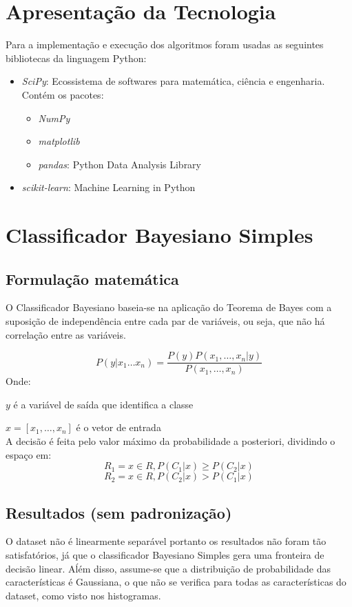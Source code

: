\documentclass[11pt,a4paper]{article}
\numberwithin{equation}{section}
\begin{document}
\section{Apresentação da Tecnologia}
Para a implementação e execução dos algoritmos foram usadas as seguintes  bibliotecas da linguagem Python:

\begin{itemize}
\item \textit{SciPy}: Ecossistema de softwares para matemática, ciência e engenharia. Contém os pacotes:
\begin{itemize}
\item \textit{NumPy}
\item \textit{matplotlib}
\item \textit{pandas}: Python Data Analysis Library
\end{itemize}
\item \textit{scikit-learn}: Machine Learning in Python
\end{itemize}


\section{Classificador Bayesiano Simples}

\subsection{Formulação matemática}
O Classificador Bayesiano baseia-se na aplicação do Teorema de Bayes com a suposição de independência entre cada par de variáveis, ou seja, que não há correlação entre as variáveis.

\[P(y|x_1 \dots x_n)  = \frac{P(y)P(x_1, \dots, x_n|y)}{P(x_1,\dots, x_n)}\]
Onde:

$y$ é a variável de saída que identifica a classe

$x = [x_1, \dots, x_n] $ é o vetor de entrada 
\\
A decisão é feita pelo valor máximo da probabilidade a posteriori, dividindo o espaço em:
\[ R_1 = {x \in R, P(C_1|x) \geq P(C_2|x)}\]
\[ R_2 = {x \in R, P(C_2|x) > P(C_1|x)}\]
\subsection{Resultados (sem padronização)}
O dataset não é linearmente separável portanto os resultados não foram tão satisfatórios, já que o classificador Bayesiano Simples gera uma fronteira de decisão linear. Aĺém disso, assume-se que a distribuição de probabilidade das características é Gaussiana, o que não se verifica para todas as características do dataset, como visto nos histogramas.
\end{document}
